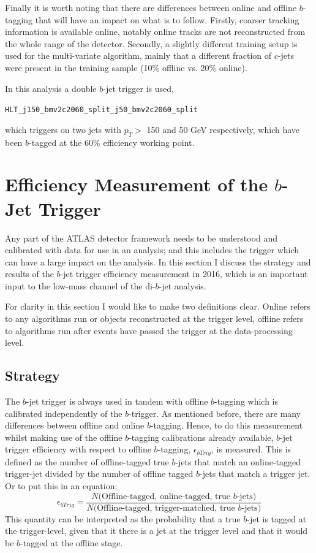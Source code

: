 Finally it is worth noting that there are  differences between online and offline $b$-tagging that will have an impact on what is to follow.
Firstly, coarser tracking information is available online, notably online tracks are not reconstructed from the whole range of the detector.
Secondly, a slightly different training setup is used for the multi-variate algorithm, mainly that a different fraction of $c$-jets were present in the training sample
(10\% offline vs. 20\% online).

In this analysis a double $b$-jet trigger is used,
\begin{center}
\verb|HLT_j150_bmv2c2060_split_j50_bmv2c2060_split|
\end{center}
which triggers on two jets with $p_T >$ 150 and 50 GeV respectively,
which have been $b$-tagged at the 60\% efficiency working point.

\newpage

\section{Efficiency Measurement of the $b$-Jet Trigger}
\label{sec:trig-bjet_eff}

Any part of the ATLAS detector framework needs to be understood and calibrated with data for use in an analysis;
and this includes the trigger which can have a large impact on the analysis.
In this section I discuss the strategy and results of the $b$-jet trigger efficiency measurement in 2016,
which is an important input to the low-mass channel of the di-$b$-jet analysis.

For clarity in this section I would like to make two definitions clear.
Online refers to any algorithms run or objects reconstructed at the trigger level,
offline refers to algorithms run after events have passed the trigger at the data-processing level. 

\subsection{Strategy}
The $b$-jet trigger is always used in tandem with offline $b$-tagging which is calibrated independently of the $b$-trigger.
As mentioned before, there are many differences between offline and online $b$-tagging.
Hence, to do this measurement whilst making use of the offline $b$-tagging calibrations already available,
$b$-jet trigger efficiency with respect to offline $b$-tagging, $\epsilon_{bTrig}$, is measured.
This is defined as the number of offline-tagged true $b$-jets that match an online-tagged trigger-jet
divided by the number of offline tagged $b$-jets that match a trigger jet.
Or to put this in an equation;
\begin{equation}
 \epsilon_{bTrig} = \frac{N(\text{Offline-tagged, online-tagged, true $b$-jets)}}{N(\text{Offline-tagged, trigger-matched, true $b$-jets)}}
\end{equation}
This quantity can be interpreted as the probability that a true $b$-jet is tagged at the trigger-level,
given that it there is a jet at the trigger level and that it would be $b$-tagged at the offline stage.

